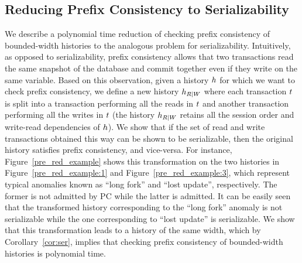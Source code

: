 
\subsection{Reducing Prefix Consistency to Serializability}\label{ssec:pc}

We describe a polynomial time reduction of checking prefix consistency of bounded-width histories to the analogous problem for serializability. Intuitively, as opposed to serializability, prefix consistency allows that two transactions read the same snapshot of the database and commit together even if they write on the same variable. Based on this observation, given a history ${h}$ for which we want to check prefix consistency, we define a new history ${h}_{R|W}$ where each transaction ${t}$ is split into a transaction performing all the reads in ${t}$ and another transaction performing all the writes in ${t}$ (the history ${h}_{R|W}$ retains all the session order and write-read dependencies of ${h}$). We show that if the set of read and write transactions obtained this way can be shown to be serializable, then the original history satisfies prefix consistency, and vice-versa. 
For instance, Figure~\ref{pre_red_example} shows this transformation on the two histories in Figure~\ref{pre_red_example:1} and Figure~\ref{pre_red_example:3}, which represent typical anomalies known as ``long fork'' and ``lost update'', respectively. The former is not admitted by PC while the latter is admitted. It can be easily seen that the transformed history corresponding to the ``long fork'' anomaly is not serializable while the one corresponding to ``lost update'' is serializable.
We show that this transformation leads to a history of the same width, which 
by Corollary~\ref{cor:ser}, implies that checking prefix consistency of bounded-width histories is polynomial time.


